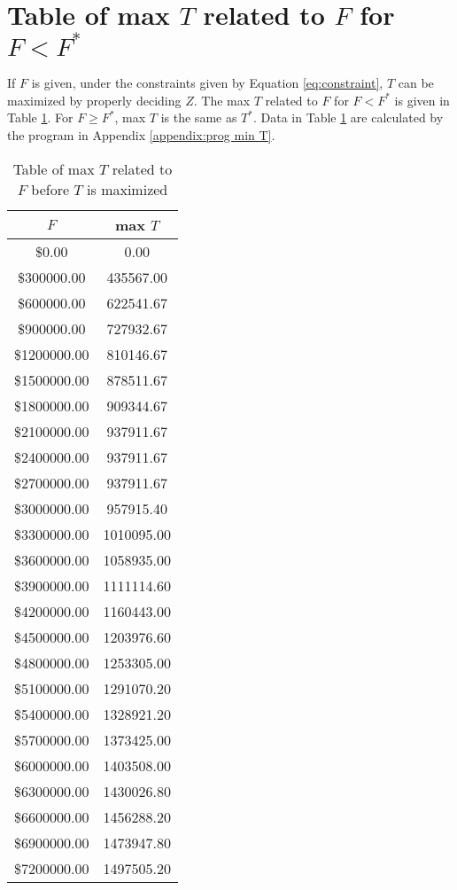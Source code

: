 \documentclass{article}
\begin{document}
\section{Table of max $T$ related to $F$ for $F<F^*$}

If $F$ is given, under the constraints given by Equation \ref{eq:constraint}, $T$ can be maximized by properly deciding $Z$.
The max $T$ related to $F$ for $F<F^*$ is given in Table \ref{tab:max T funds}.
For $F\ge F^*$, max $T$ is the same as $T^*$.
Data in Table \ref{tab:max T funds} are calculated by the program in Appendix \ref{appendix:prog min T}.

\begin{table}[h!]
\centering
\caption{Table of max $T$ related to $F$ before $T$ is maximized}
\label{tab:max T funds}
\begin{tabular}{cc}
\toprule
$F$ & max $T$\\
\midrule
\$0.00 & 0.00\\
\$300000.00 & 435567.00\\
\$600000.00 & 622541.67\\
\$900000.00 & 727932.67\\
\$1200000.00 & 810146.67\\
\$1500000.00 & 878511.67\\
\$1800000.00 & 909344.67\\
\$2100000.00 & 937911.67\\
\$2400000.00 & 937911.67\\
\$2700000.00 & 937911.67\\
\$3000000.00 & 957915.40\\
\$3300000.00 & 1010095.00\\
\$3600000.00 & 1058935.00\\
\$3900000.00 & 1111114.60\\
\$4200000.00 & 1160443.00\\
\$4500000.00 & 1203976.60\\
\$4800000.00 & 1253305.00\\
\$5100000.00 & 1291070.20\\
\$5400000.00 & 1328921.20\\
\$5700000.00 & 1373425.00\\
\$6000000.00 & 1403508.00\\
\$6300000.00 & 1430026.80\\
\$6600000.00 & 1456288.20\\
\$6900000.00 & 1473947.80\\
\$7200000.00 & 1497505.20\\

\end{tabular}
\end{table}
\end{document}
